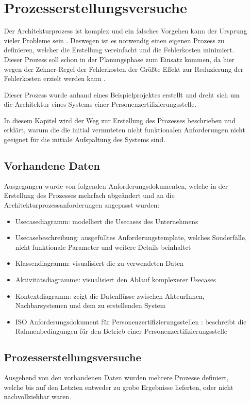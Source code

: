 \chapter{Prozesserstellungsversuche}
Der Architekturprozess ist komplex und ein falsches Vorgehen kann der Ursprung vieler Probleme sein \cite[S. 7-8]{softarch}. Deswegen ist es notwendig einen eigenen Prozess zu definieren, welcher die Erstellung vereinfacht und die Fehlerkosten minimiert. Dieser Prozess soll schon in der Planungsphase zum Einsatz kommen, da hier wegen der Zehner-Regel der Fehlerkosten der Größte Effekt zur Reduzierung der Fehlerkosten erzielt werden kann \cite[S. 154]{fehler}.

Dieser Prozess wurde anhand eines Beispielprojektes erstellt und dreht sich um die Architektur eines Systems einer Personenzertifizierungsstelle.

In diesem Kapitel wird der Weg zur Erstellung des Prozesses beschrieben und erklärt, warum die die initial vermuteten nicht funktionalen Anforderungen nicht geeignet für die initiale Aufspaltung des Systems sind.

\section{Vorhandene Daten}
Ausgegangen wurde von folgenden Anforderungsdokumenten, welche in der Erstellung des Prozesses mehrfach abgeändert und an die Architekturprozessanforderungen angepasst wurden:

\begin{itemize}
  \item Usecasediagramm: modelliert die Usecases des Unternehmens
  \item Usecasebeschreibung: ausgefülltes Anforderungstemplate, welches Sonderfälle, nicht funktionale Parameter und weitere Details beinhaltet
  \item Klassendiagramm: visualisiert die zu verwendeten Daten
  \item Aktivitätsdiagramme: visualisiert den Ablauf komplexerer Usecases
  \item Kontextdiagramm: zeigt die Datenflüsse zwischen AkteurInnen, Nachbarsystemen und dem zu erstellenden System
  \item ISO Anforderungsdokument für Personenzertifizierungsstellen \cite{ISO_CERT}: beschreibt die Rahmenbedingungen für den Betrieb einer Personenzertifizierungsstelle
\end{itemize}


\section{Prozesserstellungsversuche}
Ausgehend von den vorhandenen Daten wurden mehrere Prozesse definiert, welche bis auf den Letzten entweder zu grobe Ergebnisse lieferten, oder nicht nachvollziehbar waren.

